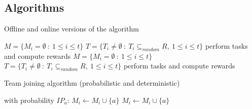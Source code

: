 \documentclass{llncs}
\begin{document}
\subsection{Algorithms}


\begin{algorithm}[H]
\caption{Offline and online versions of the algorithm}
\label{alg:main_process}
\begin{scriptsize}
\begin{algorithmic}
 
  \State $M = \{M_i = \emptyset\ :\ 1\leq i \leq t\}$ 
  \State $T = \{T_i\neq \emptyset\ :\ T_i \subseteq_{random} R,\ 1\leq i \leq t\}$ 
    \State {}
  \EndFor
  \State perform tasks and compute rewards
\EndProcedure
\Statex
{} 
  \State $M = \{M_i = \emptyset\ :\ 1\leq i \leq t\}$ 
    \State {}
  \EndFor
  \State $T = \{T_i\neq \emptyset\ :\ T_i \subseteq_{random} R,\ 1\leq i \leq t\}$ 
  \State perform tasks and compute rewards
\EndProcedure

\end{algorithmic}
\end{scriptsize}
\end{algorithm}

\begin{algorithm}[H]
\caption{Team joining algorithm (probabilistic and deterministic)}
\label{alg:join_team_org}
\begin{scriptsize}
\begin{algorithmic}
     
       
	 
	  \State with probability $IP_a$: $M_i \leftarrow M_i \cup \{a\}$ 
	\EndIf
       
	 
	  \State $M_i \leftarrow M_i \cup \{a\}$ 
	\EndIf
      \EndIf
    \EndIf
  \EndFor
\EndProcedure
\end{algorithmic}
\end{scriptsize}
\end{algorithm}
\end{document}
